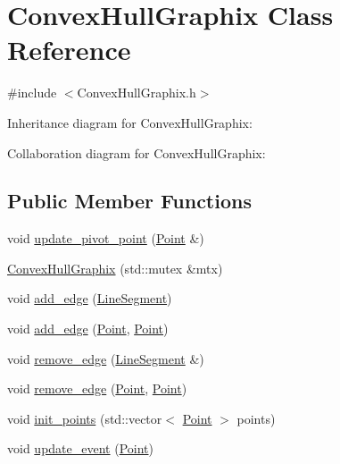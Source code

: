 \hypertarget{class_convex_hull_graphix}{}\section{Convex\+Hull\+Graphix Class Reference}
\label{class_convex_hull_graphix}


{\ttfamily \#include $<$Convex\+Hull\+Graphix.\+h$>$}



Inheritance diagram for Convex\+Hull\+Graphix\+:


Collaboration diagram for Convex\+Hull\+Graphix\+:
\subsection*{Public Member Functions}
\begin{DoxyCompactItemize}
\item 
void \mbox{\hyperlink{class_convex_hull_graphix_a463b42e0cafea416fa9a193e5efed532}{update\+\_\+pivot\+\_\+point}} (\mbox{\hyperlink{class_point}{Point}} \&)
\item 
\mbox{\hyperlink{class_convex_hull_graphix_a0788aec48348b01f660d3f6e08724c0c}{Convex\+Hull\+Graphix}} (std\+::mutex \&mtx)
\item 
void \mbox{\hyperlink{class_convex_hull_graphix_ab86fe28af236abd45c987599920bfe39}{add\+\_\+edge}} (\mbox{\hyperlink{class_line_segment}{Line\+Segment}})
\item 
void \mbox{\hyperlink{class_convex_hull_graphix_abd57f96a83ba7c4aa4da7cc00bf1530f}{add\+\_\+edge}} (\mbox{\hyperlink{class_point}{Point}}, \mbox{\hyperlink{class_point}{Point}})
\item 
void \mbox{\hyperlink{class_convex_hull_graphix_a80800d54bcbd5031eaef916d52c73139}{remove\+\_\+edge}} (\mbox{\hyperlink{class_line_segment}{Line\+Segment}} \&)
\item 
void \mbox{\hyperlink{class_convex_hull_graphix_a35c4a800c524d5ff2001d3724791bf66}{remove\+\_\+edge}} (\mbox{\hyperlink{class_point}{Point}}, \mbox{\hyperlink{class_point}{Point}})
\item 
void \mbox{\hyperlink{class_convex_hull_graphix_ac9c25b9e69637f4ffa4cb9515a0fb221}{init\+\_\+points}} (std\+::vector$<$ \mbox{\hyperlink{class_point}{Point}} $>$ points)
\item 
void \mbox{\hyperlink{class_convex_hull_graphix_a72101c075bb4fca0db552e888d1530b3}{update\+\_\+event}} (\mbox{\hyperlink{class_point}{Point}})
\end{DoxyCompactItemize}
